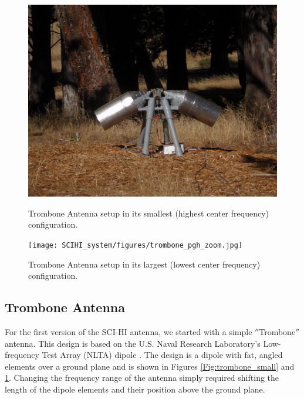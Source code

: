 \begin{figure}[htb]
\centering
\begin{minipage}[b]{0.45\textwidth}
\centering
\includegraphics[width=0.95\linewidth]{SCIHI_system/figures/trombone_guad_small.jpg}
\caption{Trombone Antenna setup in its smallest (highest center frequency) configuration.}
\label{Fig:trombone_small}
\end{minipage}%
\begin{minipage}[b]{0.02\textwidth}
\hspace{1cm}
\end{minipage}%
\begin{minipage}[b]{0.51\textwidth}
\centering
\texttt{[image: SCIHI\_system/figures/trombone\_pgh\_zoom.jpg]}
\caption{Trombone Antenna setup in its largest (lowest center frequency) configuration.}
\label{Fig:trombone_large}
\end{minipage}
\end{figure}


\subsection{Trombone Antenna}

For the first version of the SCI-HI antenna, we started with a simple $''$Trombone$''$ antenna. This design is based on the U.S. Naval Research Laboratory's Low-frequency Test Array (NLTA) dipole \cite{ellingson_2005}. The design is a dipole with fat, angled elements over a ground plane and is shown in Figures \ref{Fig:trombone_small} and \ref{Fig:trombone_large}. Changing the frequency range of the antenna simply required shifting the length of the dipole elements and their position above the ground plane. 

